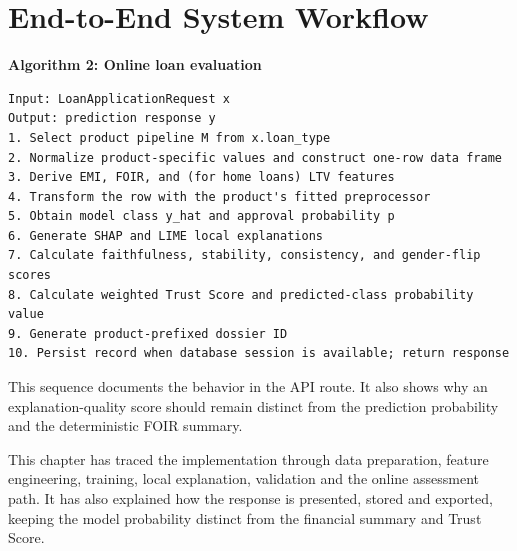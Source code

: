 \clearpage
\section{End-to-End System Workflow}
\noindent\begin{minipage}{\textwidth}
\textbf{Algorithm 2: Online loan evaluation}\par\smallskip
\begin{lstlisting}
Input: LoanApplicationRequest x
Output: prediction response y
1. Select product pipeline M from x.loan_type
2. Normalize product-specific values and construct one-row data frame
3. Derive EMI, FOIR, and (for home loans) LTV features
4. Transform the row with the product's fitted preprocessor
5. Obtain model class y_hat and approval probability p
6. Generate SHAP and LIME local explanations
7. Calculate faithfulness, stability, consistency, and gender-flip scores
8. Calculate weighted Trust Score and predicted-class probability value
9. Generate product-prefixed dossier ID
10. Persist record when database session is available; return response
\end{lstlisting}
\end{minipage}\par\medskip

This sequence documents the behavior in the API route. It also shows why an explanation-quality score should remain distinct from the prediction probability and the deterministic FOIR summary.

\par\medskip\noindent
This chapter has traced the implementation through data preparation, feature engineering, training, local explanation, validation and the online assessment path. It has also explained how the response is presented, stored and exported, keeping the model probability distinct from the financial summary and Trust Score.
